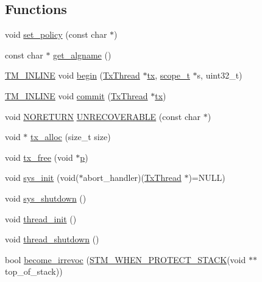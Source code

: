 \subsection*{Functions}
\begin{DoxyCompactItemize}
\item 
void \hyperlink{namespacestm_a945573c8ffc100f3908f1373d12ebffd}{set\-\_\-policy} (const char $\ast$)
\item 
const char $\ast$ \hyperlink{namespacestm_ae189ae33f77d3feb28d2f2776156a10e}{get\-\_\-algname} ()
\item 
\hyperlink{platform_8hpp_abdc8d70d196a73a2a119efdbe674ecf8}{T\-M\-\_\-\-I\-N\-L\-I\-N\-E} void \hyperlink{namespacestm_a5dc0e1df0fe411722145e01e8b09b4b8}{begin} (\hyperlink{structstm_1_1TxThread}{Tx\-Thread} $\ast$\hyperlink{stmskip_8cc_a0f1c58699b83ce5a08bd9ee859250d72}{tx}, \hyperlink{namespacestm_a91badf88c88aacc831b01a315435a255}{scope\-\_\-t} $\ast$s, uint32\-\_\-t)
\item 
\hyperlink{platform_8hpp_abdc8d70d196a73a2a119efdbe674ecf8}{T\-M\-\_\-\-I\-N\-L\-I\-N\-E} void \hyperlink{namespacestm_a94dbca4907e005c8c803e452b123903f}{commit} (\hyperlink{structstm_1_1TxThread}{Tx\-Thread} $\ast$\hyperlink{stmskip_8cc_a0f1c58699b83ce5a08bd9ee859250d72}{tx})
\item 
void \hyperlink{platform_8hpp_aa1728270d73c5d1598de1fd691762eb1}{N\-O\-R\-E\-T\-U\-R\-N} \hyperlink{namespacestm_a51b2c0958e7709b39500d037648c461b}{U\-N\-R\-E\-C\-O\-V\-E\-R\-A\-B\-L\-E} (const char $\ast$)
\item 
void $\ast$ \hyperlink{namespacestm_a74d23d2fb8a8e63642bdd14bd4941f7a}{tx\-\_\-alloc} (size\-\_\-t size)
\item 
void \hyperlink{namespacestm_aaf0d2ecece13eb0926a4b59b49cfb8cd}{tx\-\_\-free} (void $\ast$\hyperlink{counted__ptr_8hpp_a5c9f59d7c24e3fd6ceae319a968fc3e0}{p})
\item 
void \hyperlink{namespacestm_a72477788735f5e06365f341d2f09d3cb}{sys\-\_\-init} (void($\ast$abort\-\_\-handler)(\hyperlink{structstm_1_1TxThread}{Tx\-Thread} $\ast$)=N\-U\-L\-L)
\item 
void \hyperlink{namespacestm_a2eba242629a31539bd21eed09aa926c6}{sys\-\_\-shutdown} ()
\item 
void \hyperlink{namespacestm_a3de69c665250e84ef5238477ae8524b0}{thread\-\_\-init} ()
\item 
void \hyperlink{namespacestm_a2a46964337523dddb35f77c89cb0b9f4}{thread\-\_\-shutdown} ()
\item 
bool \hyperlink{namespacestm_a1f53cda33965f891e41b86a99b2424a2}{become\-\_\-irrevoc} (\hyperlink{include_2stm_2macros_8hpp_a34a90de2d4a963f0a58ac1be9b22baaf}{S\-T\-M\-\_\-\-W\-H\-E\-N\-\_\-\-P\-R\-O\-T\-E\-C\-T\-\_\-\-S\-T\-A\-C\-K}(void $\ast$$\ast$top\-\_\-of\-\_\-stack))
$$
\end{DoxyCompactItemize}
